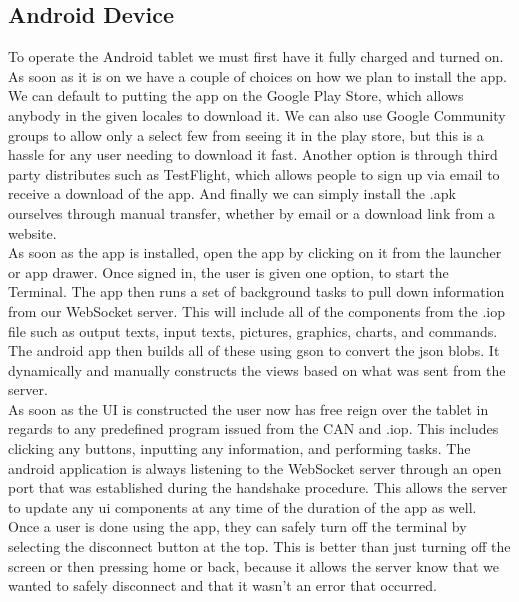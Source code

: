 \documentclass[paper=a4, fontsize=11pt]{scrartcl}
\numberwithin{equation}{section}		%
\numberwithin{figure}{section}			%
\numberwithin{table}{section}				%
\begin{document}
 \subsection{Android Device} 
 To operate the Android tablet we must first have it fully charged and turned on. As soon as it is on we have a couple of choices on how we plan to install the app. We can default to putting the app on the Google Play Store, which allows anybody in the given locales to download it. We can also use Google Community groups to allow only a select few from seeing it in the play store, but this is a hassle for any user needing to download it fast. Another option is through third party distributes such as TestFlight, which allows people to sign up via email to receive a download of the app. And finally we can simply install the .apk ourselves through manual transfer, whether by email or a download link from a website. \\

 As soon as the app is installed, open the app by clicking on it from the launcher or app drawer. Once signed in, the user is given one option, to start the Terminal. The app then runs a set of background tasks to pull down information from our WebSocket server. This will include all of the components from the .iop file such as output texts, input texts, pictures, graphics, charts, and commands. The android app then builds all of these using gson to convert the json blobs. It dynamically and manually constructs the views based on what was sent from the server. \\

 As soon as the UI is constructed the user now has free reign over the tablet in regards to any predefined program issued from the CAN and .iop. This includes clicking any buttons, inputting any information, and performing tasks. The android application is always listening to the WebSocket server through an open port that was established during the handshake procedure. This allows the server to update any ui components at any time of the duration of the app as well. \\

 Once a user is done using the app, they can safely turn off the terminal by selecting the disconnect button at the top. This is better than just turning off the screen or then pressing home or back, because it allows the server know that we wanted to safely disconnect and that it wasn't an error that occurred. \\
\end{document}

